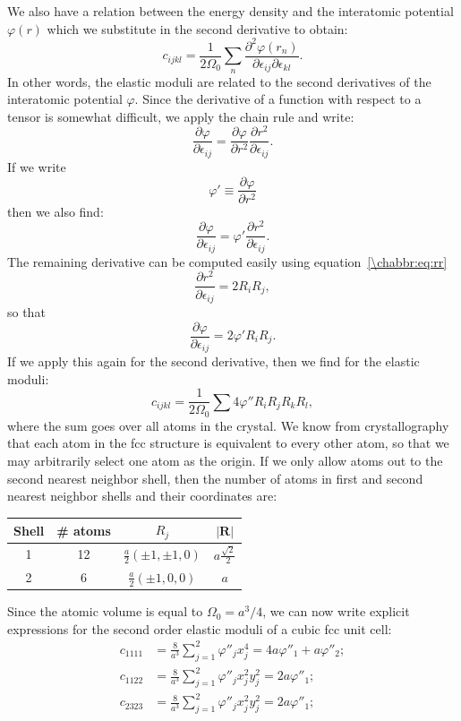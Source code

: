 We also have a relation between the energy density and the interatomic potential $\varphi(r)$ which we substitute in the second derivative to obtain:\begin{equation}
	c_{ijkl} = \frac{1}{2\Omega_0}\sum_{n} \frac{\partial^2\varphi(r_n)}{\partial\epsilon_{ij}\partial\epsilon_{kl}}.
\end{equation}
In other words, the elastic moduli are related to the second derivatives of the interatomic potential $\varphi$. Since the derivative of a function with respect to a tensor is somewhat difficult, we apply the chain rule and write:
\[
	\frac{\partial\varphi}{\partial\epsilon_{ij}} = \frac{\partial \varphi}{\partial r^2}\frac{\partial r^2}{\partial \epsilon_{ij}}.
\]
If we write 
\[
	\varphi' \equiv \frac{\partial\varphi}{\partial r^2}
\]
then we also find:
\[
	\frac{\partial\varphi}{\partial\epsilon_{ij}} = \varphi' \frac{\partial r^2}{\partial \epsilon_{ij}}.
\]
The remaining derivative can be computed easily using equation~\ref{\chabbr:eq:rr}
\[
	\frac{\partial r^2}{\partial \epsilon_{ij}} = 2 R_iR_j,
\]
so that 
\[
	\frac{\partial\varphi}{\partial\epsilon_{ij}} = 2\varphi' R_iR_j.
\]
If we apply this again for the second derivative, then we find for the elastic moduli:
\begin{equation}
	c_{ijkl} = \frac{1}{2\Omega_0}\sum 4\varphi'' R_iR_jR_kR_l,
\end{equation}
where the sum goes over all atoms in the crystal.  We know from crystallography that each atom in the fcc structure is equivalent to every other atom, so that we may arbitrarily select one atom as the origin.  If we only allow atoms out to the second nearest neighbor shell, then the number of atoms in first and second nearest neighbor shells and their coordinates are:
\begin{table}[h]
\centering\leavevmode
\begin{tabular}{cccc}
\hline
Shell & \# atoms & $R_j$ & $\vert \mathbf{R}\vert$ \\
\hline
\hline
1 & 12 & $\frac{a}{2}(\pm 1,\pm 1,0)$ & $a\frac{\sqrt{2}}{2}$ \\ 
2 & 6 & $\frac{a}{2}(\pm 1, 0, 0)$ & $a$ \\ 
\hline
\end{tabular}
\end{table}
Since the atomic volume is equal to $\Omega_0 = a^3/4$, we can now write explicit expressions for the second order elastic moduli of a cubic fcc unit cell:
\begin{align}
	c_{1111} &= \frac{8}{a^3} \sum_{j=1}^2 \varphi''_{j}x_j^4  = 4a\varphi''_1+a\varphi''_2;\\
	c_{1122} &= \frac{8}{a^3} \sum_{j=1}^2 \varphi''_{j}x_j^2y_j^2  = 2a\varphi''_1;\\
	c_{2323} &= \frac{8}{a^3} \sum_{j=1}^2 \varphi''_{j}x_j^2y_j^2  = 2a\varphi''_1;
\end{align}
